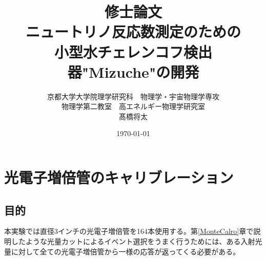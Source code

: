 \documentclass[11pt]{ltjsreport}
\newcommand{\secref}[1]{第\ref{#1}章}
\begin{document}
\begin{titlepage}

\title{修士論文\\ニュートリノ反応数測定のための\\小型水チェレンコフ検出器"Mizuche"の開発}
\author{京都大学大学院理学研究科　物理学・宇宙物理学専攻\\
物理学第二教室　高エネルギー物理学研究室\\
髙橋将太
}
\date{\today}


\end{titlepage}

\maketitle

\begin{abstract}
\end{abstract}

\tableofcontents














\chapter{光電子増倍管のキャリブレーション}
\label{PMTCalibration}
\section{目的}
本実験では直径3インチの光電子増倍管を164本使用する。\secref{MonteCalro}で説明したような光量カットによるイベント選択をうまく行うためには、ある入射光量に対して全ての光電子増倍管から一様の応答が返ってくる必要がある。
\end{document}
